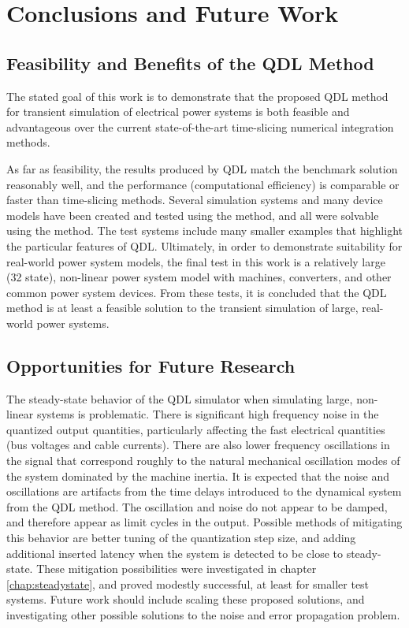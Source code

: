 
\chapter{Conclusions and Future Work}\label{chap:future}

\section{Feasibility and Benefits of the QDL Method}

The stated goal of this work is to demonstrate that the proposed QDL method for transient simulation of electrical power systems is both feasible and advantageous over the current state-of-the-art time-slicing numerical integration methods.

As far as feasibility, the results produced by QDL match the benchmark solution reasonably well, and the performance (computational efficiency) is comparable or faster than time-slicing methods. Several simulation systems and many device models have been created and tested using the method, and all were solvable using the method. The test systems include many smaller examples that highlight the particular features of QDL. Ultimately, in order to demonstrate suitability for real-world power system models, the final test in this work is a relatively large (32 state), non-linear power system model with machines, converters, and other common power system devices. From these tests, it is concluded that the QDL method is at least a feasible solution to the transient simulation of large, real-world power systems.

\section{Opportunities for Future Research}

The steady-state behavior of the QDL simulator when simulating large, non-linear systems is problematic. There is significant high frequency noise in the quantized output quantities, particularly affecting the fast electrical quantities (bus voltages and cable currents). There are also lower frequency oscillations in the signal that correspond roughly to the natural mechanical oscillation modes of the system dominated by the machine inertia. It is expected that the noise and oscillations are artifacts from the time delays introduced to the dynamical system from the QDL method. The oscillation and noise do not appear to be damped, and therefore appear as limit cycles in the output. Possible methods of mitigating this behavior are better tuning of the quantization step size, and adding additional inserted latency when the system is detected to be close to steady-state. These mitigation possibilities were investigated in chapter \ref{chap:steadystate}, and proved modestly successful, at least for smaller test systems. Future work should include scaling these proposed solutions, and investigating other possible solutions to the noise and error propagation problem.

